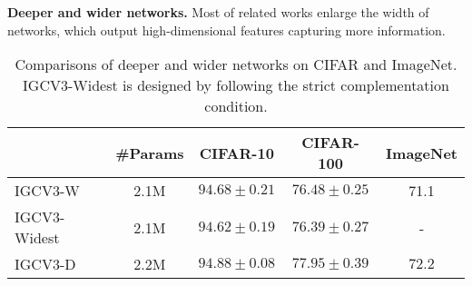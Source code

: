 \documentclass{bmvc2k}
\begin{document}
	\noindent\textbf{Deeper and wider networks.}\label{deep_wider} Most of related works enlarge the width of networks, which output high-dimensional features capturing more information.
	\begin{table}[htb!]
		\centering
		\begin{tabular}{|l||c|c|c|c|}
			\hline
			&\#Params& CIFAR-10& CIFAR-100 &ImageNet\\
			\hline\hline
			IGCV$3$-W & 2.1M   & $94.68\pm0.21$   & $76.48\pm0.25$     & 71.1 \\
			IGCV$3$-Widest & 2.1M   & $94.62\pm0.19$   & $76.39\pm0.27$     & - \\
			IGCV$3$-D & 2.2M     & $\mathbf{94.88\pm0.08}$   &   $\mathbf{77.95\pm0.39}$   &$\mathbf{72.2}$\\
			\hline
		\end{tabular}
		\caption{Comparisons of deeper and wider networks on CIFAR and ImageNet. IGCV$3$-Widest is designed by following the strict complementation condition.} %
		\label{wd_dp}
	\end{table}
\end{document}
